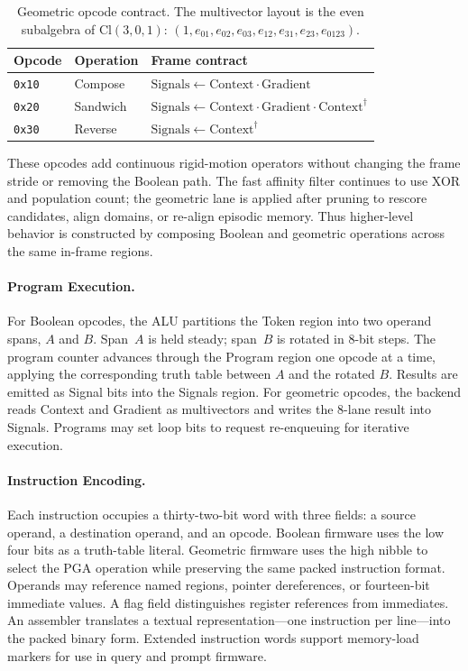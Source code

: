 \begin{table}[h]
  \centering
  \caption{Geometric opcode contract.  The multivector layout is the
           even subalgebra of $\mathrm{Cl}(3,0,1)$:
           $(1,e_{01},e_{02},e_{03},e_{12},e_{31},e_{23},e_{0123})$.}
  \label{tab:geometric_opcodes}
  \begin{tabular}{lll}
    \toprule
    \textbf{Opcode} & \textbf{Operation} & \textbf{Frame contract} \\
    \midrule
    \texttt{0x10} & Compose  & $\text{Signals} \leftarrow \text{Context} \cdot \text{Gradient}$ \\
    \texttt{0x20} & Sandwich & $\text{Signals} \leftarrow \text{Context} \cdot \text{Gradient} \cdot \text{Context}^{\dagger}$ \\
    \texttt{0x30} & Reverse  & $\text{Signals} \leftarrow \text{Context}^{\dagger}$ \\
    \bottomrule
  \end{tabular}
\end{table}

These opcodes add continuous rigid-motion operators without changing the
frame stride or removing the Boolean path.  The fast affinity filter
continues to use XOR and population count; the geometric lane is applied
after pruning to rescore candidates, align domains, or re-align episodic
memory.  Thus higher-level behavior is constructed by composing Boolean
and geometric operations across the same in-frame regions.

\paragraph{Program Execution.}
For Boolean opcodes, the ALU partitions the Token region into two
operand spans, $A$ and $B$.  Span~$A$ is held steady; span~$B$ is
rotated in 8-bit steps.  The program counter advances through the
Program region one opcode at a time, applying the corresponding truth
table between $A$ and the rotated $B$.  Results are emitted as Signal
bits into the Signals region.  For geometric opcodes, the backend reads
Context and Gradient as multivectors and writes the 8-lane result into
Signals.  Programs may set loop bits to request re-enqueuing for
iterative execution.

\paragraph{Instruction Encoding.}
Each instruction occupies a thirty-two-bit word with three fields: a
source operand, a destination operand, and an opcode.  Boolean firmware
uses the low four bits as a truth-table literal.  Geometric firmware
uses the high nibble to select the PGA operation while preserving the
same packed instruction format.  Operands may reference named regions,
pointer dereferences, or fourteen-bit immediate values.  A flag field
distinguishes register references from immediates.  An assembler
translates a textual representation---one instruction per line---into
the packed binary form.  Extended instruction words support memory-load
markers for use in query and prompt firmware.

